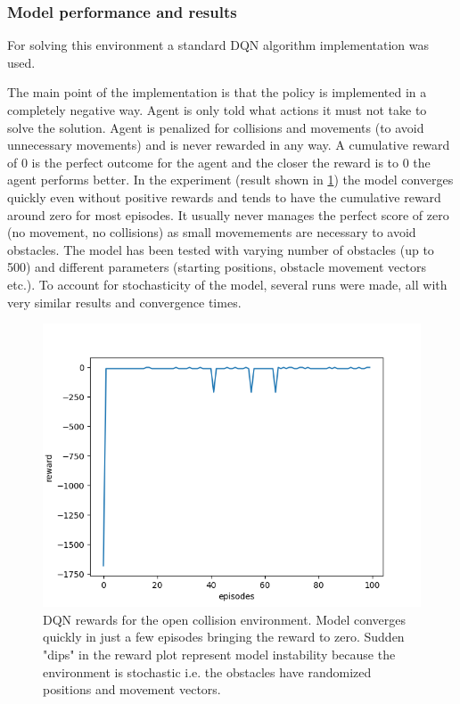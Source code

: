 \documentclass[b5paper]{book}
\begin{document}
\subsubsection{Model performance and results}

For solving this environment a standard DQN algorithm implementation was used. 

The main point of the implementation is that the policy is implemented in a completely negative way. Agent is only told what actions it must not take to solve the solution. Agent is penalized for collisions and movements (to avoid unnecessary movements) and is never rewarded in any way. A cumulative reward of 0 is the perfect outcome for the agent and the closer the reward is to 0 the agent performs better. In the experiment (result shown in \ref{fig:birdr}) the model converges quickly even without positive rewards and tends to have the cumulative reward around zero for most episodes. It usually never manages the perfect score of zero (no movement, no collisions) as small movemements are necessary to avoid obstacles. The model has been tested with varying number of obstacles (up to 500) and different parameters (starting positions, obstacle movement vectors etc.). To account for stochasticity of the model, several runs were made, all with very similar results and convergence times.  

\begin{figure}[!ht]
  \centering
  \includegraphics[scale=0.65]{figures/dqn_results.png} 
  \caption{DQN rewards for the open collision environment. Model converges quickly in just a few episodes bringing the reward to zero. Sudden "dips" in the reward plot represent model instability because the environment is stochastic i.e. the obstacles have randomized positions and movement vectors.}
  \label{fig:birdr}
\end{figure}
\end{document}
